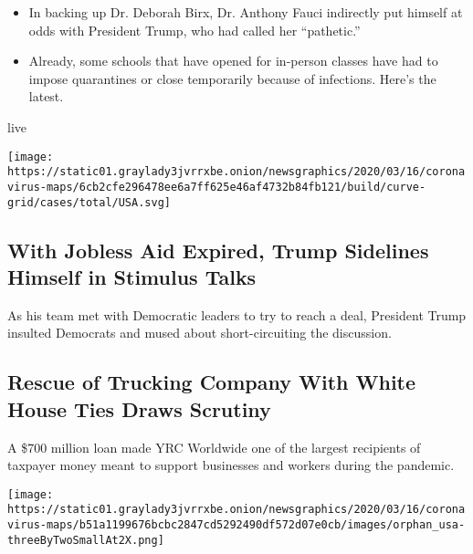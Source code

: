 \begin{itemize}
\tightlist
\item
  In backing up Dr. Deborah Birx, Dr. Anthony Fauci indirectly put
  himself at odds with President Trump, who had called her ``pathetic.''
\item
  Already, some schools that have opened for in-person classes have had
  to impose quarantines or close temporarily because of infections.
  Here's the latest.
\end{itemize}

live

\texttt{[image: https://static01.graylady3jvrrxbe.onion/newsgraphics/2020/03/16/coronavirus-maps/6cb2cfe296478ee6a7ff625e46af4732b84fb121/build/curve-grid/cases/total/USA.svg]}

\href{/2020/08/03/us/politics/congress-jobless-aid-talks-trump.html}{}

\hypertarget{with-jobless-aid-expired-trump-sidelines-himself-in-stimulus-talks}{%
\subsection{With Jobless Aid Expired, Trump Sidelines Himself in
Stimulus
Talks}\label{with-jobless-aid-expired-trump-sidelines-himself-in-stimulus-talks}}

As his team met with Democratic leaders to try to reach a deal,
President Trump insulted Democrats and mused about short-circuiting the
discussion.

\href{/2020/08/03/us/politics/yrc-coronavirus-relief-funds.html}{}

\hypertarget{rescue-of-trucking-company-with-white-house-ties-draws-scrutiny}{%
\subsection{Rescue of Trucking Company With White House Ties Draws
Scrutiny}\label{rescue-of-trucking-company-with-white-house-ties-draws-scrutiny}}

A \$700 million loan made YRC Worldwide one of the largest recipients of
taxpayer money meant to support businesses and workers during the
pandemic.

\texttt{[image: https://static01.graylady3jvrrxbe.onion/newsgraphics/2020/03/16/coronavirus-maps/b51a1199676bcbc2847cd5292490df572d07e0cb/images/orphan\_usa-threeByTwoSmallAt2X.png]}

\href{/2020/08/03/nyregion/donald-trump-taxes-cyrus-vance.html}{}

